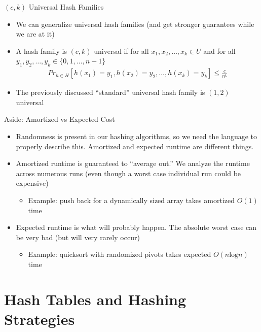 \documentclass[aspectratio=169]{beamer}
\begin{document}
\begin{frame}{$(c, k)$ Universal Hash Families}
    \begin{itemize}
        \item We can generalize universal hash families (and get stronger guarantees while we are at it)
        \item A hash family is $(c, k)$ universal if for all $x_1, x_2, \ldots, x_k \in U$ and for all $y_1, y_2, \ldots, y_k \in \{0, 1, \ldots, n - 1\}$
        \begin{align*}
            Pr_{h \in H}[h(x_1) = y_1, h(x_2) = y_2, \ldots, h(x_k) = y_k] \le \frac c {n^k}
        \end{align*} \pause
        \item The previously discussed ``standard'' universal hash family is $(1, 2)$ universal
    \end{itemize}
\end{frame}

\begin{frame}{Aside: Amortized vs Expected Cost}
    \begin{itemize}
        \item Randomness is present in our hashing algorithms, so we need the language to properly describe this. Amortized and expected runtime are different things. \pause
        \item Amortized runtime is guaranteed to ``average out.'' We analyze the runtime across numerous runs (even though a worst case individual run could be expensive)
        \begin{itemize}
            \item Example: push back for a dynamically sized array takes amortized $O(1)$ time
        \end{itemize} \pause
        \item Expected runtime is what will probably happen. The absolute worst case can be very bad (but will very rarely occur)
        \begin{itemize}
            \item Example: quicksort with randomized pivots takes expected $O(n \text{log} n)$ time
        \end{itemize}
    \end{itemize}
\end{frame}

\section{Hash Tables and Hashing Strategies}
\frame{\sectionpage}
\end{document}
